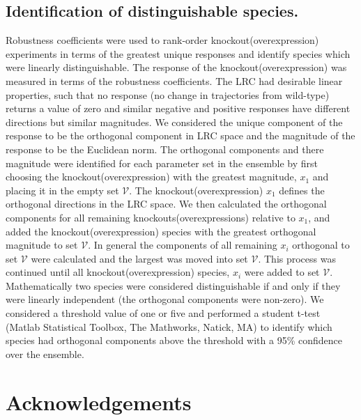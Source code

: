 \documentclass[fleqn,10pt]{wlscirep}
\begin{document}
\subsection*{Identification of distinguishable species.}
Robustness coefficients were used to rank-order knockout(overexpression) experiments in terms of the greatest unique responses and identify species which were linearly distinguishable. The response of the knockout(overexpression) was measured in terms of the robustness coefficients. The LRC had desirable linear properties, such that no response (no change in trajectories from wild-type) returns a value of zero and similar negative and positive responses have different directions but similar magnitudes. We considered the unique component of the response to be the orthogonal component in LRC space and the magnitude of the response to be the Euclidean norm. The orthogonal components and there magnitude were identified for each parameter set in the ensemble by first choosing the knockout(overexpression) with the greatest magnitude, $x_{1}$ and placing it in the empty set $\mathcal{V}$. The knockout(overexpression) $x_{1}$ defines the orthogonal directions in the LRC space. We then calculated the orthogonal components for all remaining knockouts(overexpressions) relative to $x_{1}$, and added the knockout(overexpression) species with the greatest orthogonal magnitude to set $\mathcal{V}$. In general the components of all remaining $x_{i}$ orthogonal to set $\mathcal{V}$ were calculated and the largest was moved into set $\mathcal{V}$. This process was continued until all knockout(overexpression) species, $x_{i}$ were added to set $\mathcal{V}$. Mathematically two species were considered distinguishable if and only if they were linearly independent (the orthogonal components were non-zero). We considered a threshold value of one or five and performed a student t-test (Matlab Statistical Toolbox, The Mathworks, Natick, MA) to identify which species had orthogonal components above the threshold with a 95\% confidence over the ensemble. 




\section*{Acknowledgements}
\end{document}
